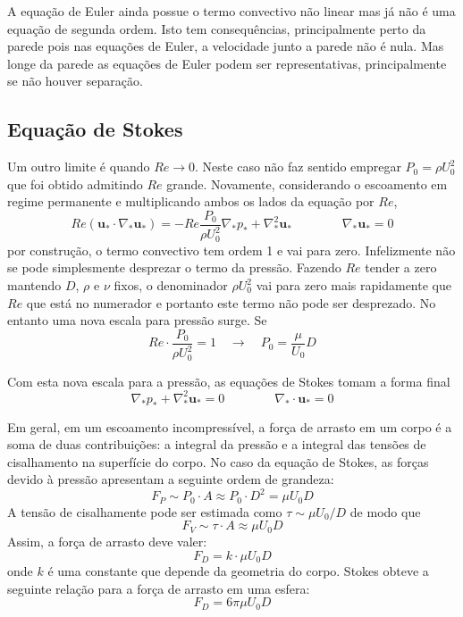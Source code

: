 \documentclass[article,12pt,oneside,a4paper,english,brazil,sumario=tradicional]{abntex2}
\newcommand{\p}[1]{\ensuremath{ \mathbf{#1}}}    %
\newcommand{\lra}{\ensuremath{\longrightarrow}}
\newcommand{\qrq}{\ensuremath{\quad\lra\quad}}
\begin{document}
A equação de Euler ainda possue o termo convectivo não linear mas já não é uma equação de segunda ordem. Isto tem consequências, principalmente perto da parede pois nas equações de Euler, a velocidade junto a parede não é nula. Mas longe da parede as equações de Euler podem ser representativas, principalmente se não houver separação.

\subsection{Equação de Stokes}
Um outro limite é quando $Re\lra 0$. Neste caso não faz sentido empregar $P_0 = \rho U_0^2$ que foi obtido admitindo $Re$ grande. Novamente, considerando o escoamento em regime permanente e multiplicando ambos os lados da equação por $Re$, 
\[
Re\left(\p{u}_*\cdot\nabla_*\p{u_*}\right) = -Re\frac{P_0}{\rho U_0^2}\nabla_* p_* + \nabla_*^2\p{u}_* \qquad\qquad \nabla_*\p{u}_* = 0
\]
por construção, o termo convectivo tem ordem 1 e  vai para zero. Infelizmente não se pode simplesmente desprezar o termo da pressão. Fazendo $Re$ tender a zero mantendo $D$, $\rho$ e $\nu$ fixos, o denominador $\rho U_0^2$ vai para zero mais rapidamente que $Re$ que está no numerador e portanto este termo não pode ser desprezado. No entanto uma nova escala para pressão surge. Se
\[
Re\cdot\frac{P_0}{\rho U_0^2} = 1 \qrq P_0 = \frac{\mu}{U_0}{D}
\]

Com esta nova escala para a pressão, as equações de Stokes tomam a forma final
\begin{equation}
\nabla_* p_* + \nabla_*^2\p{u}_* = 0 \qquad\qquad \nabla_*\cdot\p{u}_* = 0
\label{eq:stokes}
\end{equation}

Em geral, em um escoamento incompressível, a força de arrasto em um corpo é a soma de duas contribuições: a integral da pressão e a integral das tensões de cisalhamento na superfície do corpo. No caso da equação de Stokes, as forças devido à pressão apresentam a seguinte ordem de grandeza:
\[
F_P \sim P_0 \cdot A \approx P_0 \cdot D^2 =\mu U_0 D
\]
A tensão de cisalhamente pode ser estimada como $\tau \sim \mu U_0 / D$ de modo que 
\[
F_V \sim \tau \cdot A \approx \mu U_0 D
\]
Assim, a força de arrasto deve valer:
\[
F_D = k \cdot \mu U_0 D
\]
onde $k$ é uma constante que depende da geometria do corpo. Stokes obteve a seguinte relação para a força de arrasto em uma esfera:
\begin{equation}
F_D = 6\pi\mu U_0 D
\label{eq:cdstokes}
\end{equation}
\end{document}
